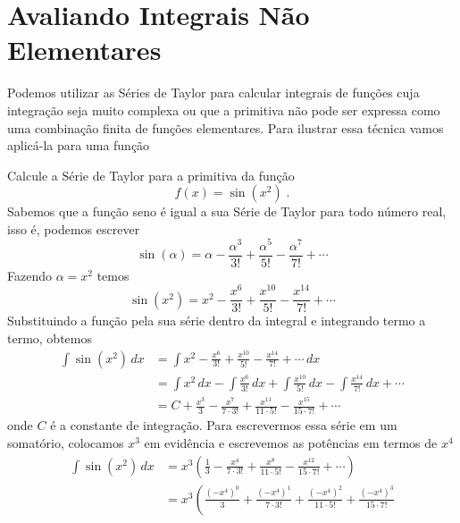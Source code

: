 \section{Avaliando Integrais Não Elementares}

Podemos utilizar as Séries de Taylor para calcular integrais de funções
cuja integração seja muito complexa ou que a primitiva não pode ser expressa
como uma combinação finita de funções elementares.
Para ilustrar essa técnica vamos aplicá-la para uma função

\begin{example}
  Calcule a Série de Taylor para a primitiva da função
  \[
    f(x) = \sin\left(x^2\right) \;.
  \]
  \solution
  Sabemos que a função seno é igual a sua Série de Taylor para todo número real,
  isso é, podemos escrever
  \[
    \sin(\alpha) = \alpha -\frac{\alpha^3}{3!} +\frac{\alpha^5}{5!} -\frac{\alpha^7}{7!} +\cdots
  \]
  Fazendo \(\alpha = x^2 \) temos
  \[
    \sin\left(x^2\right) = x^2 -\frac{x^6}{3!} +\frac{x^{10}}{5!} -\frac{x^{14}}{7!} + \cdots
  \]
  Substituindo a função pela sua série dentro da integral e integrando termo a termo, obtemos
  \begin{align*}
    \int \sin \left(x^2\right) \,dx & = \int x^2
      - \frac{x^6}{3!}
      + \frac{x^{10}}{5!}
      - \frac{x^{14}}{7!}
      + \cdots  \,dx                                    \\[5mm]
                                    & = \int x^2 \,dx
      - \int \frac{x^6}{3!} \,dx
      + \int \frac{x^{10}}{5!} \,dx
      - \int \frac{x^{14}}{7!} \,dx
      + \cdots       \\[5mm]
                                    & = C
      + \frac{x^3}{3}
      - \frac{x^7}{7\cdot 3!}
      + \frac{x^{11}}{11\cdot 5!}
      - \frac{x^{15}}{15\cdot 7!}
      + \cdots
  \end{align*}
  onde $C$ é a constante de integração.
  Para escrevermos essa série em um somatório, colocamos $x^3$
  em evidência e escrevemos as potências em termos de $x^4$
  \begin{align*}
    \int \sin \left(x^2\right) \,dx
    & = x^3 \left(
        \frac{1}{3}
      - \frac{x^4}{7\cdot 3!}
      + \frac{x^8}{11\cdot 5!}
      - \frac{x^{12}}{15\cdot 7!}
      + \cdots
      \right) \\[3mm]
    & = x^3 \left(
        \frac{\left(-x^4\right)^0}{3}
      + \frac{(-x^4)^1}{7\cdot 3!}
      + \frac{\left(-x^4\right)^2}{11\cdot 5!}
      + \frac{\left(-x^4\right)^3}{15\cdot 7!}

\end{align*}
\end{example}
